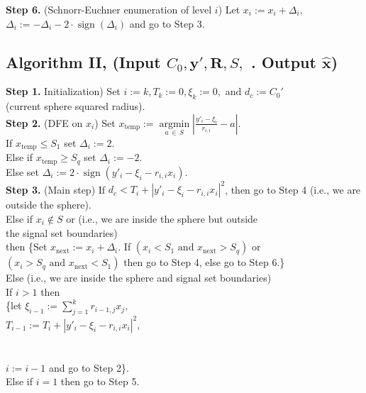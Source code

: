 \documentclass[english,12pt,a4paper,pdftex,sci,utf8]{aaltothesis}
\begin{document}
\noindent \textbf{Step 6.} (Schnorr-Euchner enumeration of level $i$) Let $x_i := x_i + \Delta_i,$\\
\indent $\Delta_i := -\Delta_i - 2\cdot\operatorname{sign}(\Delta_i)  $ and go to Step 3.\\

\subsection*{Algorithm II, (Input $C_0, \mathbf{y'}, \mathbf{R}, S,$ . Output $\mathbf{\hat{x}}$)}
\textbf{Step 1.} Initialization) Set $i := k, T_k := 0, \xi_k := 0,$  and $d_c := C_0'$ \\
\indent (current sphere squared radius). \\

\noindent \textbf{Step 2.} (DFE on $x_i$) Set $x_{\text{temp}} :=\underset{a\,\in\,S}{\operatorname{argmin}}\left|\frac{y'_i - \xi_i}{r_{i,i}} - a \right|$. \\
\indent If $x_{\text{temp}} \leq S_1$ set $\Delta_i := 2$. \\
\indent Else if $x_{\text{temp}} \geq S_{q}$ set $\Delta_i := -2$. \\
\indent Else set $\Delta_i := 2 \cdot \operatorname{sign}\left(y'_i-\xi_i-r_{i,i}x_i\right)$. \\

\noindent \textbf{Step 3.} (Main step) If $d_c < T_i + \left|y'_i-\xi_i-r_{i,i}x_i\right|^2$, then go to Step 4 (i.e., we are\\
\indent outside the sphere).\\
\indent Else if $x_i \not\in S$ or  (i.e., we are inside the sphere but outside \\
\indent the signal set boundaries) \\ 
\indent then \{Set $x_{\text{next}} := x_i + \Delta_i$. If $(x_i < S_1\,\, \text{and}\,\, x_{\text{next}} > S_q)$ or \\
\indent $(x_i > S_q\,\, \text{and}\,\, x_{\text{next}} < S_{1})$ then go to Step 4, else go to Step 6.\}  \\
\indent Else (i.e., we are inside the sphere and signal set boundaries) \\
\indent\indent If $i > 1$ then \\
\indent\indent\indent \{let $\xi_{i-1} := \sum_{j=1}^{k} r_{i-1,j}x_j,$\\ 
\indent\indent\indent $T_{i-1} := T_i + \left|y'_i-\xi_i-r_{i,i}x_i\right|^2,$\\
\indent\indent\indent {} \\
\indent\indent\indent {}\\
\indent\indent\indent $i := i - 1$ and go to Step 2\}. \\
\indent\indent Else if $i=1$ then go to Step 5. \\
\end{document}
